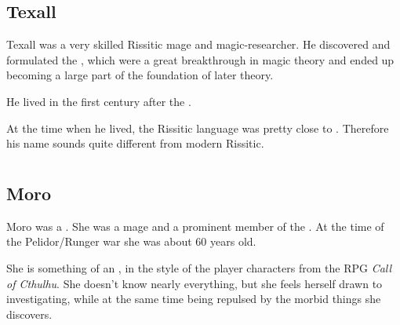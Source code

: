 \section{Texall}
Texall was a very skilled Rissitic mage and magic-researcher. 
He discovered and formulated the , which were a great breakthrough in magic theory and ended up becoming a large part of the foundation of later  theory. 

He lived in the first century after the . 

At the time when he lived, the Rissitic language was pretty close to \Ortaican. 
Therefore his name sounds quite different from modern Rissitic. 























\chapter{\Ortaicans}















\section{Moro \Cornel}
Moro \Cornel{} was a \sphyle{}. 
She was a \rethyactic mage and a prominent member of the \Malcuric{} \ishrah. 
At the time of the Pelidor/Runger war she was about 60 years old. 

She is something of an , in the style of the player characters from the RPG \emph{Call of Cthulhu}. She doesn't know nearly everything, but she feels herself drawn to investigating, while at the same time being repulsed by the morbid things she discovers. 









